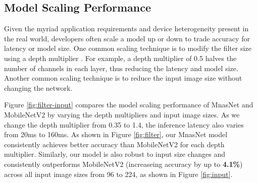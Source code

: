 \documentclass[10pt,twocolumn,letterpaper]{article}
\begin{document}
\subsection{Model Scaling Performance}

Given the myriad application requirements and device heterogeneity present in the real world, developers often scale a model up or down to trade accuracy for latency or model size.
One common scaling technique is to modify the filter size using a depth multiplier  \cite{mobilenetv117}. For example, a depth multiplier of 0.5 halves the number of channels in each layer, thus reducing the latency and model size. Another common scaling technique is to reduce the input image size without changing the network.

Figure \ref{fig:filter-input} compares the model scaling performance of MnasNet and MobileNetV2 by varying  the depth multipliers  and input image sizes. As we change the depth multiplier from 0.35 to 1.4, the inference latency also varies from 20ms to 160ms. As shown in Figure \ref{fig:filter}, our MnasNet model consistently achieves better accuracy than MobileNetV2 for each depth multiplier.  Similarly, our model is also robust to input size changes and consistently outperforms MobileNetV2 (increaseing accuracy by up to \textbf{4.1\%}) across all input image sizes from 96 to 224, as shown in Figure \ref{fig:input}.

%
%
\begin{table}
  \centering                                                                        
  \caption{                                                                         
      \textbf{Model Scaling vs. Model Search} --  denote scaling the baseline models with depth multiplier 0.35;  denotes models from a new architecture search that targets 22ms latency constraint.
  }                                                                              
  \label{tab:searchvsscale}                                                         
\end{table}  
\end{document}
